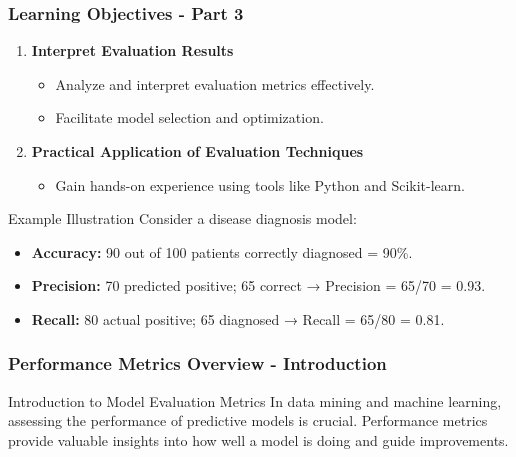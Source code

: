 \documentclass{beamer}
\begin{document}
\begin{frame}[fragile]
    \frametitle{Learning Objectives - Part 3}
    \begin{enumerate}[resume]
        \item \textbf{Interpret Evaluation Results}
            \begin{itemize}
                \item Analyze and interpret evaluation metrics effectively.
                \item Facilitate model selection and optimization.
            \end{itemize}

        \item \textbf{Practical Application of Evaluation Techniques}
            \begin{itemize}
                \item Gain hands-on experience using tools like Python and Scikit-learn.
            \end{itemize}

    \end{enumerate}

    \begin{block}{Example Illustration}
        Consider a disease diagnosis model:
        \begin{itemize}
            \item \textbf{Accuracy:} 90 out of 100 patients correctly diagnosed = 90\%.
            \item \textbf{Precision:} 70 predicted positive; 65 correct → Precision = 65/70 = 0.93.
            \item \textbf{Recall:} 80 actual positive; 65 diagnosed → Recall = 65/80 = 0.81.
        \end{itemize}
    \end{block}
\end{frame}

\begin{frame}[fragile]
    \frametitle{Performance Metrics Overview - Introduction}
    \begin{block}{Introduction to Model Evaluation Metrics}
        In data mining and machine learning, assessing the performance of predictive models is crucial. 
        Performance metrics provide valuable insights into how well a model is doing and guide improvements.
    \end{block}
\end{frame}
\end{document}
